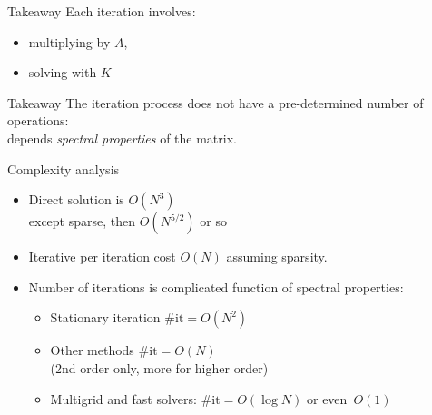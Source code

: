 \begin{frame}{Takeaway}
  Each iteration involves:
  \begin{itemize}
  \item multiplying by $A$,
  \item solving with $K$
  \end{itemize}
\end{frame}

\begin{longstory}


\begin{frame}{Takeaway}
  The iteration process does not have a pre-determined number of
  operations:\\
  depends \emph{spectral properties} of the matrix.
\end{frame}

\begin{frame}{Complexity analysis}
\begin{itemize}
\item Direct solution is $O(N^3)$\\
  except sparse, then $O(N^{5/2})$ or so
\item Iterative per iteration cost $O(N)$ assuming sparsity.
\item Number of iterations is complicated function of spectral properties:
  \begin{itemize}
  \item Stationary iteration $\#\mathrm{it}=O(N^2)$
  \item Other methods $\#\mathrm{it}=O(N)$\\
    (2nd order only, more for higher order)
  \item Multigrid and fast solvers: $\#\mathrm{it}=O(\log N)$ or even~$O(1)$
  \end{itemize}
\end{itemize}
\end{frame}


\end{longstory}

